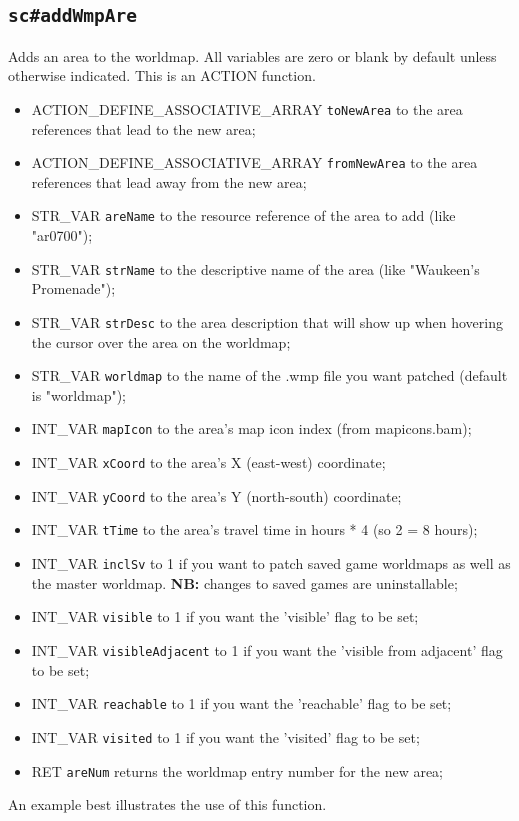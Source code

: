 \documentclass{article}
\def\DEFINE#1{{\tt \bf #1}\label{#1}\index{#1}}
\begin{document}
\subsection{\DEFINE{sc\#addWmpAre}}
Adds an area to the worldmap. All variables are zero or blank by default unless otherwise indicated.
This is an ACTION function.

\begin{itemize}
\item ACTION_DEFINE_ASSOCIATIVE_ARRAY \verb+toNewArea+ to the area references that lead to the new area;
\item ACTION_DEFINE_ASSOCIATIVE_ARRAY \verb+fromNewArea+ to the area references that lead away from the new area;
\item STR_VAR \verb+areName+ to the resource reference of the area to add (like "ar0700");
\item STR_VAR \verb+strName+ to the descriptive name of the area (like "Waukeen's Promenade");
\item STR_VAR \verb+strDesc+ to the area description that will show up when hovering the cursor over the area on the worldmap;
\item STR_VAR \verb+worldmap+ to the name of the .wmp file you want patched (default is "worldmap");
\item INT_VAR \verb+mapIcon+ to the area's map icon index (from mapicons.bam);
\item INT_VAR \verb+xCoord+ to the area's X (east-west) coordinate;
\item INT_VAR \verb+yCoord+ to the area's Y (north-south) coordinate;
\item INT_VAR \verb+tTime+ to the area's travel time in hours * 4 (so 2 = 8 hours);
\item INT_VAR \verb+inclSv+ to 1 if you want to patch saved game worldmaps as well as the master worldmap. \textbf{NB:} changes to saved games are uninstallable;
\item INT_VAR \verb+visible+ to 1 if you want the 'visible' flag to be set;
\item INT_VAR \verb+visibleAdjacent+ to 1 if you want the 'visible from adjacent' flag to be set;
\item INT_VAR \verb+reachable+ to 1 if you want the 'reachable' flag to be set;
\item INT_VAR \verb+visited+ to 1 if you want the 'visited' flag to be set;
\item RET \verb+areNum+ returns the worldmap entry number for the new area;
\end{itemize}
An example best illustrates the use of this function.
\end{document}
